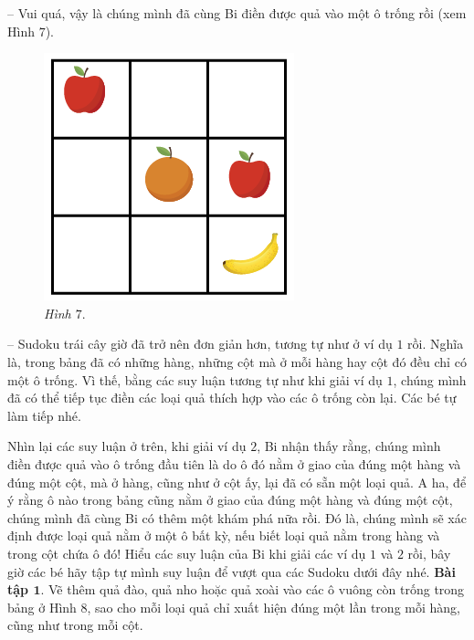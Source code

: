 	\begin{multicols}{2}
	-- Vui quá, vậy là chúng mình đã cùng Bi điền được quả vào một ô trống rồi (xem Hình $7$).
		\begin{figure}[H]
		\vspace*{-5pt}
		\centering
		\captionsetup{labelformat=empty, justification=centering}
		\includegraphics[scale=0.4]{hinh7}
		\caption{\textit{\small Hình $7.$}}
		\vspace*{-5pt}
		\end{figure}
		-- Sudoku trái cây giờ đã trở nên đơn giản hơn, tương tự như ở ví dụ $1$ rồi. Nghĩa là, trong bảng đã có những hàng, những cột mà ở mỗi hàng hay cột đó đều chỉ có một ô trống. Vì thế, bằng các suy luận tương tự như khi giải ví dụ $1$, chúng mình đã có thể tiếp tục điền các loại quả thích hợp vào các ô trống còn lại. Các bé tự làm tiếp nhé.
	\end{multicols}
	\vskip 0.1cm
	Nhìn lại các suy luận ở trên, khi giải ví dụ $2$, Bi nhận thấy rằng, chúng mình điền được quả vào ô trống đầu tiên là do ô đó nằm ở giao của đúng một hàng và đúng một cột, mà ở hàng, cũng như ở cột ấy, lại đã có sẵn một loại quả. A ha, để ý rằng ô nào trong bảng cũng nằm ở giao của đúng một hàng và đúng một cột, chúng mình đã cùng Bi có thêm một khám phá nữa rồi. Đó là, chúng mình sẽ xác định được loại quả nằm ở một ô bất kỳ, nếu biết loại quả nằm trong hàng và trong cột chứa ô đó!
	\vskip 0.1cm
	Hiểu các suy luận của Bi khi giải các ví dụ $1$ và $2$ rồi, bây giờ các bé hãy tập tự mình suy luận để vượt qua các Sudoku dưới đây nhé.
	\vskip 0.1cm
	\textbf{\color{toancuabi}Bài tập $\pmb{1.}$} Vẽ thêm quả đào, quả nho hoặc quả xoài vào các ô vuông còn trống trong bảng ở Hình $8$, sao cho mỗi loại quả chỉ xuất hiện đúng một lần trong mỗi hàng, cũng như trong mỗi cột.
	\vskip 0.3cm
